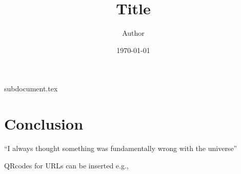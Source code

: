 \documentclass{article}
\title{Title}
\author{Author}
\date{\today}
\begin{document}
\maketitle
{subdocument.tex}

\section{Conclusion}
``I always thought something was fundamentally wrong with the universe''
\cite{adams1995hitchhiker}

QRcodes for URLs
can be inserted e.g.,


\lipsum

% 
% 
\printbibliography
\end{document}
